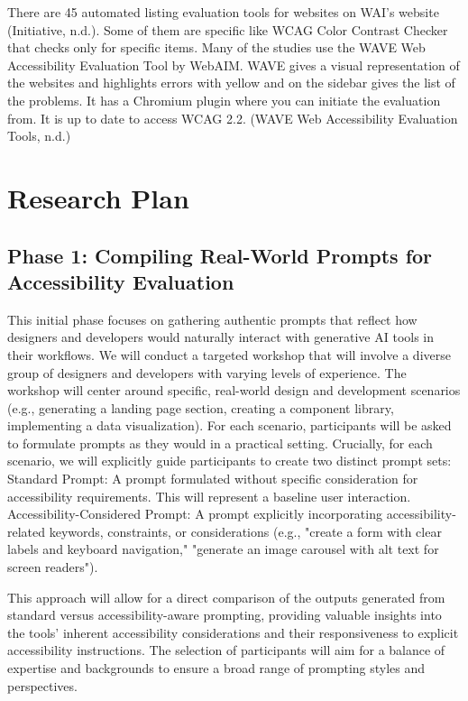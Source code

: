 \documentclass{article}
\begin{document}
There are 45 automated listing  evaluation tools for websites on WAI’s website (Initiative, n.d.). Some of them are specific like WCAG Color Contrast Checker that checks only for specific items. Many of the studies use the WAVE Web Accessibility Evaluation Tool by WebAIM. WAVE gives a visual representation of the websites and highlights errors with yellow and on the sidebar gives the list of the problems. It has a Chromium plugin where you can initiate the evaluation from.  It is up to date to access WCAG 2.2. (WAVE Web Accessibility Evaluation Tools, n.d.)

\section{Research Plan}

\subsection{Phase 1: Compiling Real-World Prompts for Accessibility Evaluation}

This initial phase focuses on gathering authentic prompts that reflect how designers and developers would naturally interact with generative AI tools in their workflows. We will conduct a targeted workshop that will involve a diverse group of designers and developers with varying levels of experience. The workshop will center around specific, real-world design and development scenarios (e.g., generating a landing page section, creating a component library, implementing a data visualization). For each scenario, participants will be asked to formulate prompts as they would in a practical setting. Crucially, for each scenario, we will explicitly guide participants to create two distinct prompt sets:
Standard Prompt: A prompt formulated without specific consideration for accessibility requirements. This will represent a baseline user interaction.
Accessibility-Considered Prompt: A prompt explicitly incorporating accessibility-related keywords, constraints, or considerations (e.g., "create a form with clear labels and keyboard navigation," "generate an image carousel with alt text for screen readers").

This approach will allow for a direct comparison of the outputs generated from standard versus accessibility-aware prompting, providing valuable insights into the tools' inherent accessibility considerations and their responsiveness to explicit accessibility instructions. The selection of participants will aim for a balance of expertise and backgrounds to ensure a broad range of prompting styles and perspectives.
\end{document}
